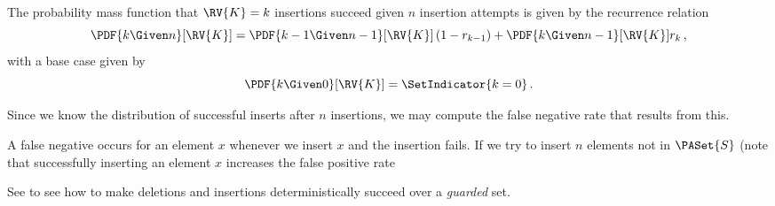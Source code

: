 \documentclass[ ../main.tex]{subfiles}
\begin{document}
The probability mass function that $\RV{K} = k$ insertions succeed given $n$ insertion attempts is given by the recurrence relation
\begin{equation}
    \PDF{k \Given n}[\RV{K}] = \PDF{k-1 \Given n-1}[\RV{K}]\left(1 - r_{k-1}\right) + \PDF{k \Given n-1}[\RV{K}] r_k\,,
\end{equation}
with a base case given by
\begin{equation}
    \PDF{k \Given 0}[\RV{K}] = \SetIndicator{k=0}\,.
\end{equation}

Since we know the distribution of successful inserts after $n$ insertions, we may compute the false negative rate that results from this.

A false negative occurs for an element $x$ whenever we insert $x$ and the insertion fails. If we try to insert $n$ elements not in $\PASet{S}$ (note that successfully inserting an element $x$ increases the false positive rate 

See  to see how to make deletions and insertions deterministically succeed over a \emph{guarded} set.



%
\end{document}
